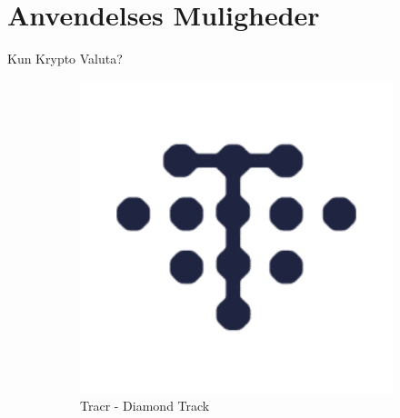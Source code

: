 \documentclass[12pt,t]{beamer}
\begin{document}


\section{Anvendelses Muligheder}

\begin{frame}{Kun Krypto Valuta?}
	\begin{figure}
	\centering
	\begin{subfigure}[b]{0.45\textwidth}
		\centering
		\includegraphics[width=1\textwidth]{tracr.png}
		\caption{Tracr - Diamond Track}
	\end{subfigure}
	\begin{subfigure}[b]{0.45\textwidth}
		

\end{subfigure}
\end{figure}
\end{frame}
\end{document}
